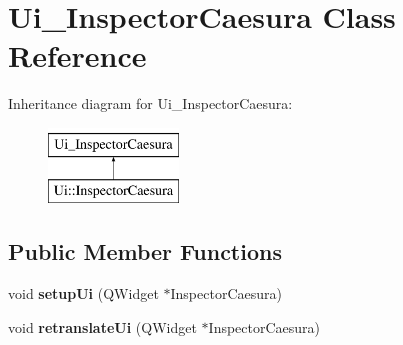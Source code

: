 \hypertarget{class_ui___inspector_caesura}{}\section{Ui\+\_\+\+Inspector\+Caesura Class Reference}
\label{class_ui___inspector_caesura}
Inheritance diagram for Ui\+\_\+\+Inspector\+Caesura\+:\begin{figure}[H]
\begin{center}
\leavevmode
\includegraphics[height=2.000000cm]{class_ui___inspector_caesura}
\end{center}
\end{figure}
\subsection*{Public Member Functions}
\begin{DoxyCompactItemize}
\item 
\mbox{\label{class_ui___inspector_caesura_a24166df0942554ae62807b1e33cadf1d}} 
void {\bfseries setup\+Ui} (Q\+Widget $\ast$Inspector\+Caesura)
\item 
\mbox{\label{class_ui___inspector_caesura_ab82542499cfe8b1683a9ea6983e4c42a}} 
void {\bfseries retranslate\+Ui} (Q\+Widget $\ast$Inspector\+Caesura)
\end{DoxyCompactItemize}
